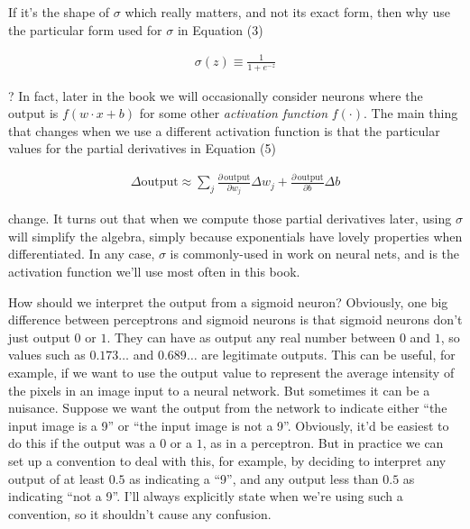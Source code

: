 If it's the shape of $\sigma$ which really matters, and not its exact form, then why use the particular form used for $\sigma$ in Equation (3)

\begin{align*}
\sigma(z) \equiv \frac{1}{1+e^{-z}} \nonumber
\end{align*}

\noindent? In fact, later in the book we will occasionally consider neurons where the output is $f(w \cdot x + b)$ for some other \emph{activation function} $f(\cdot)$. The main thing that changes when we use a different activation function is that the particular values for the partial derivatives in Equation (5)

\begin{align*}
\Delta \mbox{output} \approx \sum_j \frac{\partial \, \mbox{output}}{\partial w_j} \Delta w_j + \frac{\partial \, \mbox{output}}{\partial b} \Delta b \nonumber
\end{align*}

\noindent change. It turns out that when we compute those partial derivatives later, using $\sigma$ will simplify the algebra, simply because exponentials have lovely properties when differentiated. In any case, $\sigma$ is commonly-used in work on neural nets, and is the activation function we'll use most often in this book.


How should we interpret the output from a sigmoid neuron? Obviously, one big difference between perceptrons and sigmoid neurons is that sigmoid neurons don't just output $0$ or $1$. They can have as output any real number between $0$ and $1$, so values such as $0.173\ldots$ and $0.689\ldots$ are legitimate outputs. This can be useful, for example, if we want to use the output value to represent the average intensity of the pixels in an image input to a neural network. But sometimes it can be a nuisance. Suppose we want the output from the network to indicate either ``the input image is a 9'' or ``the input image is not a 9''. Obviously, it'd be easiest to do this if the output was a $0$ or a $1$, as in a perceptron. But in practice we can set up a convention to deal with this, for example, by deciding to interpret any output of at least $0.5$ as indicating a ``9'', and any output less than $0.5$ as indicating ``not a 9''. I'll always explicitly state when we're using such a convention, so it shouldn't cause any confusion.



